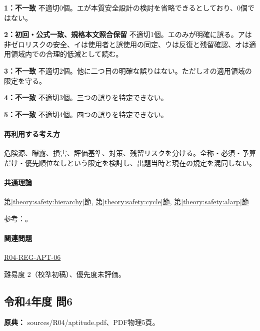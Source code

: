 \noindent\textbf{1：不一致} 不適切0個。エが本質安全設計の検討を省略できるとしており、0個ではない。\par

\noindent\textbf{2：初回・公式一致、規格本文照合保留} 不適切1個。エのみが明確に誤る。アは非ゼロリスクの安全、イは使用者と誤使用の同定、ウは反復と残留確認、オは適用領域内での合理的低減として読む。\par

\noindent\textbf{3：不一致} 不適切2個。他に二つ目の明確な誤りはない。ただしオの適用領域の限定を守る。\par

\noindent\textbf{4：不一致} 不適切3個。三つの誤りを特定できない。\par

\noindent\textbf{5：不一致} 不適切4個。四つの誤りを特定できない。\par

\paragraph{再利用する考え方} 危険源、曝露、損害、評価基準、対策、残留リスクを分ける。全称・必須・予算だけ・優先順位なしという限定を検討し、出題当時と現在の規定を混同しない。

\paragraph{共通理論} \hyperref[theory:safety:hierarchy]{第\ref*{theory:safety:hierarchy}節}, \hyperref[theory:safety:cycle]{第\ref*{theory:safety:cycle}節}, \hyperref[theory:safety:alarp]{第\ref*{theory:safety:alarp}節}

\par 参考：\cite{saf_ra2006,saf_guide51,saf_parliament2006}。

\paragraph{関連問題} \hyperref[q:r04-reg-apt-06]{R04-REG-APT-06}

\par 難易度 2（校準初稿）、優先度未評価。

\subsection{令和4年度 問6}
\label{q:r04-reg-apt-06}

\noindent\textbf{原典：} sources/R04/aptitude.pdf、PDF物理5頁。

